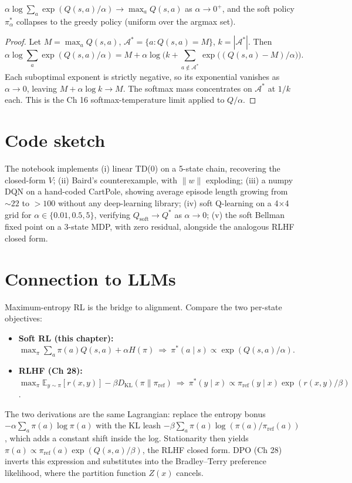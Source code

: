 \begin{theorem}
$\alpha\log\sum_a\exp(Q(s,a)/\alpha)\to\max_a Q(s,a)$ as $\alpha\to 0^+$, and the soft policy $\pi^*_\alpha$ collapses to the greedy policy (uniform over the argmax set).
\end{theorem}

\begin{proof}
Let $M=\max_a Q(s,a)$, $\mathcal{A}^*=\{a:Q(s,a)=M\}$, $k=|\mathcal{A}^*|$. Then
\[
\alpha\log\sum_a\exp(Q(s,a)/\alpha)=M+\alpha\log\!\Big(k+\sum_{a\notin\mathcal{A}^*}\exp\!\big((Q(s,a)-M)/\alpha\big)\Big).
\]
Each suboptimal exponent is strictly negative, so its exponential vanishes as $\alpha\to 0$, leaving $M+\alpha\log k\to M$. The softmax mass concentrates on $\mathcal{A}^*$ at $1/k$ each. This is the Ch 16 softmax-temperature limit applied to $Q/\alpha$.
\end{proof}

\section*{Code sketch}

The notebook implements (i) linear TD(0) on a 5-state chain, recovering the closed-form $V$; (ii) Baird's counterexample, with $\|w\|$ exploding; (iii) a numpy DQN on a hand-coded CartPole, showing average episode length growing from $\sim 22$ to $>100$ without any deep-learning library; (iv) soft Q-learning on a 4$\times$4 grid for $\alpha\in\{0.01,0.5,5\}$, verifying $Q_{\mathrm{soft}}\to Q^*$ as $\alpha\to 0$; (v) the soft Bellman fixed point on a 3-state MDP, with zero residual, alongside the analogous RLHF closed form.

\section*{Connection to LLMs}

Maximum-entropy RL is the bridge to alignment. Compare the two per-state objectives:
\begin{itemize}
\item \textbf{Soft RL (this chapter):} $\max_\pi\sum_a\pi(a)Q(s,a)+\alpha H(\pi)\ \Rightarrow\ \pi^*(a\mid s)\propto\exp(Q(s,a)/\alpha)$.
\item \textbf{RLHF (Ch 28):} $\max_\pi\mathbb{E}_{y\sim\pi}[r(x,y)]-\beta D_{\mathrm{KL}}(\pi\|\pi_{\mathrm{ref}})\ \Rightarrow\ \pi^*(y\mid x)\propto\pi_{\mathrm{ref}}(y\mid x)\exp(r(x,y)/\beta)$.
\end{itemize}
The two derivations are the same Lagrangian: replace the entropy bonus $-\alpha\sum_a\pi(a)\log\pi(a)$ with the KL leash $-\beta\sum_a\pi(a)\log(\pi(a)/\pi_{\mathrm{ref}}(a))$, which adds a constant shift inside the log. Stationarity then yields $\pi(a)\propto\pi_{\mathrm{ref}}(a)\exp(Q(s,a)/\beta)$, the RLHF closed form. DPO (Ch 28) inverts this expression and substitutes into the Bradley--Terry preference likelihood, where the partition function $Z(x)$ cancels.

